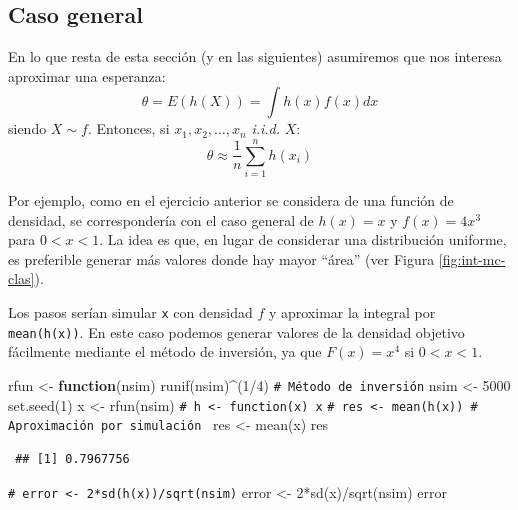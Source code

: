 \documentclass[
]{book}
\newenvironment{Shaded}{\begin{snugshade}}{\end{snugshade}}
\newcommand{\CommentTok}[1]{\textcolor[rgb]{0.56,0.35,0.01}{\textit{#1}}}
\newcommand{\ControlFlowTok}[1]{\textcolor[rgb]{0.13,0.29,0.53}{\textbf{#1}}}
\newcommand{\DecValTok}[1]{\textcolor[rgb]{0.00,0.00,0.81}{#1}}
\newcommand{\FunctionTok}[1]{\textcolor[rgb]{0.00,0.00,0.00}{#1}}
\newcommand{\NormalTok}[1]{#1}
\newcommand{\OtherTok}[1]{\textcolor[rgb]{0.56,0.35,0.01}{#1}}
\newcommand{\SpecialCharTok}[1]{\textcolor[rgb]{0.00,0.00,0.00}{#1}}
\theoremstyle{break}
\theoremstyle{nonumberplain}
\renewcommand{\CommentTok}[1]{\textcolor[rgb]{0.41,0.41,0.41}{\texttt{#1}}}
\begin{document}
\hypertarget{caso-general}{%
\subsection{Caso general}\label{caso-general}}

En lo que resta de esta sección (y en las siguientes) asumiremos que nos interesa aproximar una esperanza:
\[\theta = E\left( h\left( X\right) \right) = \int h\left( x\right) f(x)dx\]
siendo \(X\sim f\).
Entonces, si \(x_1,x_2,\ldots ,x_n\) \emph{i.i.d.} \(X\):
\[\theta \approx \frac{1}{n}\sum\limits_{i=1}^nh\left( x_i\right)\]

Por ejemplo, como en el ejercicio anterior se considera de una función de densidad,
se correspondería con el caso general de \(h(x) = x\) y \(f(x) = 4x^3\) para \(0<x<1\).
La idea es que, en lugar de considerar una distribución uniforme,
es preferible generar más valores donde hay mayor ``área'' (ver Figura \ref{fig:int-mc-clas}).

Los pasos serían simular \texttt{x} con densidad \(f\) y aproximar la integral por \texttt{mean(h(x))}.
En este caso podemos generar valores de la densidad objetivo fácilmente mediante el método de inversión, ya que \(F(x) = x^4\) si \(0<x<1\).

\begin{Shaded}
\begin{Highlighting}[]
\NormalTok{rfun }\OtherTok{\textless{}{-}} \ControlFlowTok{function}\NormalTok{(nsim) }\FunctionTok{runif}\NormalTok{(nsim)}\SpecialCharTok{\^{}}\NormalTok{(}\DecValTok{1}\SpecialCharTok{/}\DecValTok{4}\NormalTok{) }\CommentTok{\# Método de inversión}
\NormalTok{nsim }\OtherTok{\textless{}{-}} \DecValTok{5000}
\FunctionTok{set.seed}\NormalTok{(}\DecValTok{1}\NormalTok{)}
\NormalTok{x }\OtherTok{\textless{}{-}} \FunctionTok{rfun}\NormalTok{(nsim)}
\CommentTok{\# h \textless{}{-} function(x) x}
\CommentTok{\# res \textless{}{-} mean(h(x)) \# Aproximación por simulación }
\NormalTok{res }\OtherTok{\textless{}{-}} \FunctionTok{mean}\NormalTok{(x)}
\NormalTok{res}
\end{Highlighting}
\end{Shaded}

\begin{verbatim}
 ## [1] 0.7967756
\end{verbatim}

\begin{Shaded}
\begin{Highlighting}[]
\CommentTok{\# error \textless{}{-} 2*sd(h(x))/sqrt(nsim)}
\NormalTok{error }\OtherTok{\textless{}{-}} \DecValTok{2}\SpecialCharTok{*}\FunctionTok{sd}\NormalTok{(x)}\SpecialCharTok{/}\FunctionTok{sqrt}\NormalTok{(nsim)}
\NormalTok{error}
\end{Highlighting}
\end{Shaded}
\end{document}
